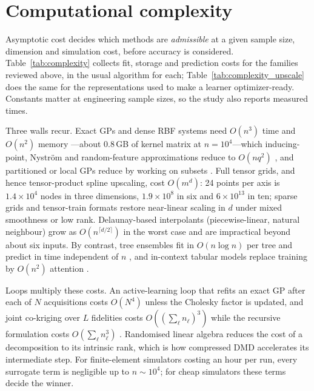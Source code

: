 \section{Computational complexity}
\label{sec:complexity}

Asymptotic cost decides which methods are \emph{admissible} at a given sample size, dimension and simulation cost,
before accuracy is considered. Table~\ref{tab:complexity} collects fit, storage and prediction costs for the families
reviewed above, in the usual algorithm for each; Table~\ref{tab:complexity_upscale} does the same for the
representations used to make a learner optimizer-ready. Constants matter at engineering sample sizes, so the study
also reports measured times.

Three walls recur. Exact GPs and dense RBF systems need $O(n^3)$ time and $O(n^2)$ memory
\cite{rasmussen2006gaussian,wendland2004scattered}---about 0.8\,GB of kernel matrix at $n=10^4$---which inducing-point,
Nystr\"om and random-feature approximations reduce to $O(nq^2)$ \cite{titsias2009variational,williams2001using,rahimi2007random},
and partitioned or local GPs reduce by working on subsets \cite{gramacy2008bayesian,gramacy2015local}. Full tensor
grids, and hence tensor-product spline upscaling, cost $O(m^d)$: 24 points per axis is $1.4\times10^4$ nodes in three
dimensions, $1.9\times10^8$ in six and $6\times10^{13}$ in ten; sparse grids \cite{bungartz2004sparse} and tensor-train
formats \cite{oseledets2011tensor,oseledets2010tt} restore near-linear scaling in $d$ under mixed smoothness or low rank.
Delaunay-based interpolants (piecewise-linear, natural neighbour) grow as $O(n^{\lceil d/2\rceil})$ in the worst case and
are impractical beyond about six inputs. By contrast, tree ensembles fit in $O(n\log n)$ per tree and predict in time
independent of $n$ \cite{breiman2001random,chen2016xgboost,ke2017lightgbm}, and in-context tabular models replace training
by $O(n^2)$ attention \cite{hollmann2025tabpfn}.

Loops multiply these costs. An active-learning loop that refits an exact GP after each of $N$ acquisitions costs
$O(N^4)$ unless the Cholesky factor is updated, and joint co-kriging over $L$ fidelities costs $O((\sum_\ell n_\ell)^3)$ while
the recursive formulation costs $O(\sum_\ell n_\ell^3)$ \cite{legratiet2014recursive}. Randomised linear algebra
\cite{halko2011finding,erichson2019randomized} reduces the cost of a decomposition to its intrinsic rank, which is how
compressed DMD accelerates its intermediate step. For finite-element simulators costing an hour per run, every surrogate
term is negligible up to $n\sim10^4$; for cheap simulators these terms decide the winner.

